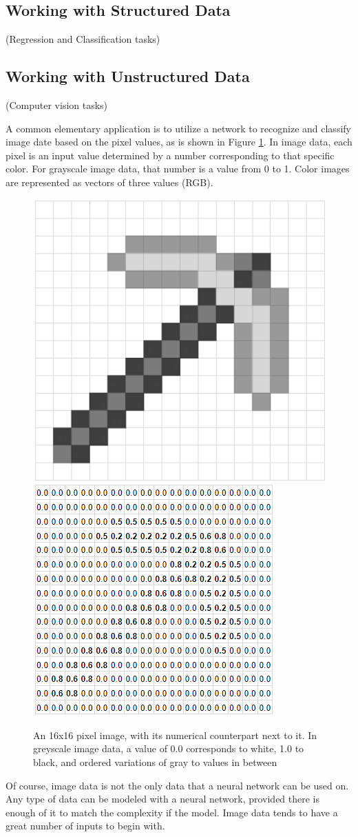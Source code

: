 \subsection{Working with Structured Data} %

(Regression and Classification tasks)

\subsection{Working with Unstructured Data} %

(Computer vision tasks)

A common elementary application is to utilize a network to recognize and classify image date based on the pixel values, as is shown in Figure \ref{minecraft}.  In image data, each pixel is an input value determined by a number corresponding to that specific color.  For grayscale image data, that number is a value from 0 to 1.  Color images are represented as vectors of three values (RGB).

\begin{figure}[H]
    \centering
    \includegraphics[width=.2\textwidth]{Figures/pickaxe_1.png}
    \hspace{60pt}
    \includegraphics[width=.5\textwidth]{Figures/pickaxe_2.png}
    \caption{\footnotesize{An 16x16 pixel image, with its numerical counterpart next to it.  In greyscale image data, a value of 0.0 corresponds to white, 1.0 to black, and ordered variations of gray to values in between}}
    \label{minecraft}
\end{figure}

Of course, image data is not the only data that a neural network can be used on.  Any type of data can be modeled with a neural network, provided there is enough of it to match the complexity if the model.  Image data tends to have a great number of inputs to begin with.